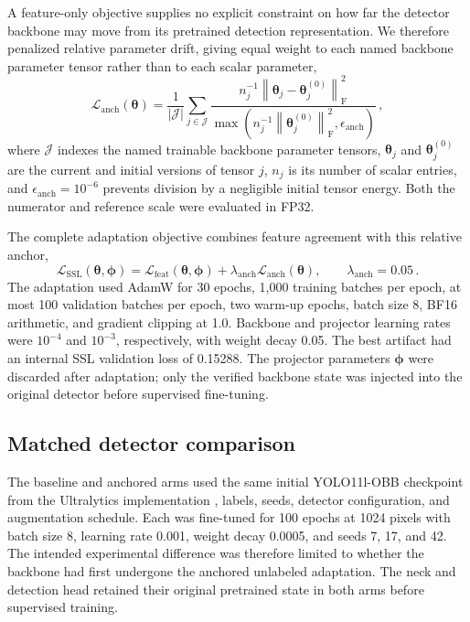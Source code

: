 \documentclass[preprint,12pt,authoryear]{elsarticle}
\begin{document}
A feature-only objective supplies no explicit constraint on how far the detector backbone may move from its pretrained detection representation. We therefore penalized relative parameter drift, giving equal weight to each named backbone parameter tensor rather than to each scalar parameter,
\begin{equation}
\mathcal{L}_{\mathrm{anch}}(\bm{\theta})
=
\frac{1}{|\mathcal{J}|}
\sum_{j\in\mathcal{J}}
\frac{n_j^{-1}
\left\lVert\bm{\theta}_j-\bm{\theta}^{(0)}_j\right\rVert_{\mathrm{F}}^2}
{\max\!\left(
n_j^{-1}\left\lVert\bm{\theta}^{(0)}_j\right\rVert_{\mathrm{F}}^2,
\epsilon_{\mathrm{anch}}\right)}\,,
\label{eq:anchor}
\end{equation}
where $\mathcal{J}$ indexes the named trainable backbone parameter tensors, $\bm{\theta}_j$ and $\bm{\theta}^{(0)}_j$ are the current and initial versions of tensor $j$, $n_j$ is its number of scalar entries, and $\epsilon_{\mathrm{anch}}=10^{-6}$ prevents division by a negligible initial tensor energy. Both the numerator and reference scale were evaluated in FP32.

The complete adaptation objective combines feature agreement with this relative anchor,
\begin{equation}
\mathcal{L}_{\mathrm{SSL}}(\bm{\theta},\bm{\phi})
=
\mathcal{L}_{\mathrm{feat}}(\bm{\theta},\bm{\phi})
+\lambda_{\mathrm{anch}}\mathcal{L}_{\mathrm{anch}}(\bm{\theta}),
\qquad
\lambda_{\mathrm{anch}}=0.05\,.
\label{eq:total}
\end{equation}
The adaptation used AdamW for 30 epochs, 1,000 training batches per epoch, at most 100 validation batches per epoch, two warm-up epochs, batch size 8, BF16 arithmetic, and gradient clipping at 1.0. Backbone and projector learning rates were $10^{-4}$ and $10^{-3}$, respectively, with weight decay 0.05. The best artifact had an internal SSL validation loss of 0.15288. The projector parameters $\bm{\phi}$ were discarded after adaptation; only the verified backbone state was injected into the original detector before supervised fine-tuning.

\subsection{Matched detector comparison}

The baseline and anchored arms used the same initial YOLO11l-OBB checkpoint from the Ultralytics implementation \citep{ultralytics}, labels, seeds, detector configuration, and augmentation schedule. Each was fine-tuned for 100 epochs at 1024 pixels with batch size 8, learning rate 0.001, weight decay 0.0005, and seeds 7, 17, and 42. The intended experimental difference was therefore limited to whether the backbone had first undergone the anchored unlabeled adaptation. The neck and detection head retained their original pretrained state in both arms before supervised training.
\end{document}
